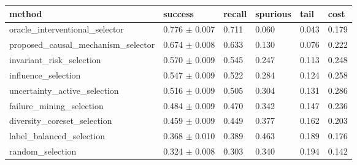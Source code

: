 \begin{tabular}{llllll}
\toprule
method & success & recall & spurious & tail & cost \\
\midrule
oracle\_interventional\_selector & 0.776 $\pm$ 0.007 & 0.711 & 0.060 & 0.043 & 0.179 \\
proposed\_causal\_mechanism\_selector & 0.674 $\pm$ 0.008 & 0.633 & 0.130 & 0.076 & 0.222 \\
invariant\_risk\_selection & 0.570 $\pm$ 0.009 & 0.545 & 0.247 & 0.113 & 0.248 \\
influence\_selection & 0.547 $\pm$ 0.009 & 0.522 & 0.284 & 0.124 & 0.258 \\
uncertainty\_active\_selection & 0.516 $\pm$ 0.009 & 0.505 & 0.304 & 0.131 & 0.286 \\
failure\_mining\_selection & 0.484 $\pm$ 0.009 & 0.470 & 0.342 & 0.147 & 0.236 \\
diversity\_coreset\_selection & 0.459 $\pm$ 0.009 & 0.449 & 0.377 & 0.162 & 0.203 \\
label\_balanced\_selection & 0.368 $\pm$ 0.010 & 0.389 & 0.463 & 0.189 & 0.176 \\
random\_selection & 0.324 $\pm$ 0.008 & 0.303 & 0.340 & 0.194 & 0.142 \\
\bottomrule
\end{tabular}
